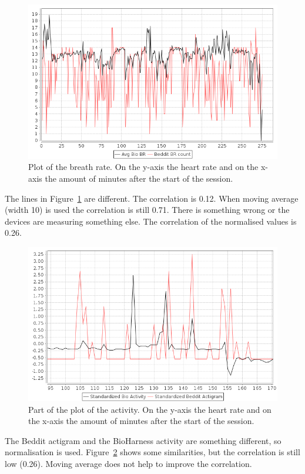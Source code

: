 			\begin{figure}[h]
				\centering
					\includegraphics[scale=0.5]{vsbr.png}
					
				\caption{Plot of the breath rate. On the y-axis the heart rate and on the x-axis the amount of minutes after the start of the session.}
				\label{fig:vsbr}

			\end{figure}

			The lines in Figure~\ref{fig:vsbr} are different. The correlation is 0.12. When moving average (width 10) is used the correlation is still 0.71. There is something wrong or the devices are measuring something else. The correlation of the normalised values is 0.26. 
						
			\begin{figure}[h]
				\centering
					\includegraphics[scale=0.5]{vsactivity.png}
					
				\caption{Part of the plot of the activity. On the y-axis the heart rate and on the x-axis the amount of minutes after the start of the session.}
				\label{fig:vsactivity}

			\end{figure}
			The Beddit actigram and the BioHarness activity are something different, so normalisation is used. Figure~\ref{fig:vsactivity} shows some similarities, but the correlation is still low (0.26). Moving average does not help to improve the correlation.

